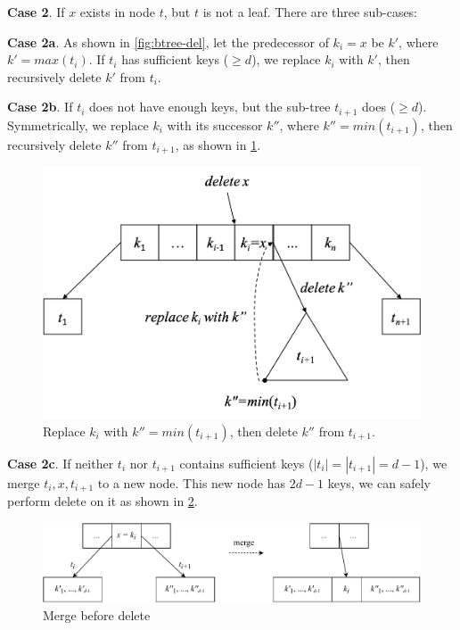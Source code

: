 \documentclass[b5paper]{article}
\begin{document}
\textbf{Case 2}. If $x$ exists in node $t$, but $t$ is not a leaf. There are three sub-cases:

\textbf{Case 2a}. As shown in \cref{fig:btree-del}, let the predecessor of $k_i = x$ be $k'$, where $k' = max(t_i)$. If $t_i$ has sufficient keys ($\geq d$), we replace $k_i$ with $k'$, then recursively delete $k'$ from $t_i$.

\textbf{Case 2b}. If $t_i$ does not have enough keys, but the sub-tree $t_{i+1}$ does ($\geq d$). Symmetrically, we replace $k_i$ with its successor $k''$, where $k'' = min(t_{i+1})$, then recursively delete $k''$ from $t_{i+1}$, as shown in \cref{fig:btree-del-case2b}.

\begin{figure}[htbp]
  \centering
  \includegraphics[scale=0.5]{img/btree-del-case2b}
  \caption{Replace $k_i$ with $k'' = min(t_{i+1})$, then delete $k''$ from $t_{i+1}$.}
  \label{fig:btree-del-case2b}
\end{figure}

\textbf{Case 2c}. If neither $t_i$ nor $t_{i+1}$ contains sufficient keys ($|t_i| = |t_{i+1}| = d - 1$), we merge $t_i, x, t_{i+1}$ to a new node. This new node has $2d - 1$ keys, we can safely perform delete on it as shown in \cref{fig:btree-del-merge}.

\begin{figure}[htbp]
  \centering
  \includegraphics[scale=0.65]{img/btree-del-merge}
  \caption{Merge before delete}
  \label{fig:btree-del-merge}
\end{figure}
\end{document}
